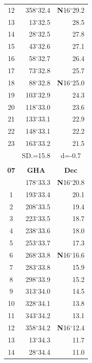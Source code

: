 \documentclass[10pt, a4paper]{report}
\begin{document}
\begin{scriptsize}
\begin{tabular*}{0.2\textwidth}[t]{@{\extracolsep{\fill}}|c|rr|}
12 & 358$^\circ$32.4 & \textbf{N}16$^\circ$29.2\\
13 & 13$^\circ$32.5 & 28.5\\
14 & 28$^\circ$32.5 & 27.8\\
15 & 43$^\circ$32.6 & \raisebox{0.24ex}{\boldmath$\cdot$~\boldmath$\cdot$~~}27.1\\
16 & 58$^\circ$32.7 & 26.4\\
17 & 73$^\circ$32.8 & 25.7\\[2Pt]
18 & 88$^\circ$32.8 & \textbf{N}16$^\circ$25.0\\
19 & 103$^\circ$32.9 & 24.3\\
20 & 118$^\circ$33.0 & 23.6\\
21 & 133$^\circ$33.1 & \raisebox{0.24ex}{\boldmath$\cdot$~\boldmath$\cdot$~~}22.9\\
22 & 148$^\circ$33.1 & 22.2\\
23 & 163$^\circ$33.2 & 21.5\\
\hline
\rule{0pt}{2.4ex} & \multicolumn{1}{c}{SD.=15.8} & \multicolumn{1}{c|}{d=-0.7}\\
\hline
\multicolumn{1}{c}{}\\[-0.5ex]\hline
\multicolumn{1}{|c|}{\rule{0pt}{2.6ex}\textbf{07}} & \multicolumn{1}{c}{\textbf{GHA}} & \multicolumn{1}{c|}{\textbf{Dec}}\\
\hline\rule{0pt}{2.6ex}\noindent
0 & 178$^\circ$33.3 & \textbf{N}16$^\circ$20.8\\
1 & 193$^\circ$33.4 & 20.1\\
2 & 208$^\circ$33.5 & 19.4\\
3 & 223$^\circ$33.5 & \raisebox{0.24ex}{\boldmath$\cdot$~\boldmath$\cdot$~~}18.7\\
4 & 238$^\circ$33.6 & 18.0\\
5 & 253$^\circ$33.7 & 17.3\\[2Pt]
6 & 268$^\circ$33.8 & \textbf{N}16$^\circ$16.6\\
7 & 283$^\circ$33.8 & 15.9\\
8 & 298$^\circ$33.9 & 15.2\\
9 & 313$^\circ$34.0 & \raisebox{0.24ex}{\boldmath$\cdot$~\boldmath$\cdot$~~}14.5\\
10 & 328$^\circ$34.1 & 13.8\\
11 & 343$^\circ$34.2 & 13.1\\[2Pt]
12 & 358$^\circ$34.2 & \textbf{N}16$^\circ$12.4\\
13 & 13$^\circ$34.3 & 11.7\\
14 & 28$^\circ$34.4 & 11.0\\

\end{tabular*}
\end{scriptsize}
\end{document}
